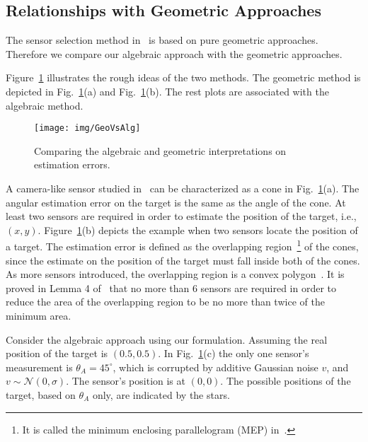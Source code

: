 \subsection{Relationships with Geometric Approaches}\label{s:geo}
The sensor selection method in~\cite{isler06tase} is based on pure geometric approaches. Therefore we compare our algebraic approach with the geometric approaches.

Figure~\ref{f:alggeo} illustrates the rough ideas of the two methods. The geometric method is depicted in Fig.~\ref{f:alggeo}(a) and Fig.~\ref{f:alggeo}(b). The rest plots are associated with the algebraic method.
\begin{figure}
  \centering
  \texttt{[image: img/GeoVsAlg]}\\
  \caption{Comparing the algebraic and geometric interpretations on estimation errors.}\label{f:alggeo}
\end{figure}
    A camera-like sensor studied in~\cite{isler06tase} can be characterized as a cone in Fig.~\ref{f:alggeo}(a). The angular estimation error on the target is the same as the angle of the cone. At least two sensors are required in order to estimate the position of the target, i.e., $(x,y)$. Figure~\ref{f:alggeo}(b) depicts the example when two sensors locate the position of a target.
        The estimation error is defined as the overlapping region~\footnote{It is called the minimum enclosing parallelogram (MEP) in~\cite{isler06tase}.} of the cones, since the estimate on the position of the target must fall inside both of the cones. As more sensors introduced, the overlapping region is a convex polygon~\cite{isler06tase}. It is proved in Lemma 4 of~\cite{isler06tase} that no more than 6 sensors are required in order to reduce the area of the overlapping region to be no more than twice of the minimum area.


Consider the algebraic approach using our formulation. Assuming the real position of the target is $(0.5,0.5)$.
 In Fig.~\ref{f:alggeo}(c) the only one sensor's measurement is $\theta_A=45^\circ$, which is corrupted by additive Gaussian noise $v$, and $v\sim \mathcal{N}(0,\sigma)$. The sensor's position is at $(0,0)$. The possible positions of the target, based on $\theta_A$ only, are indicated by the stars.



